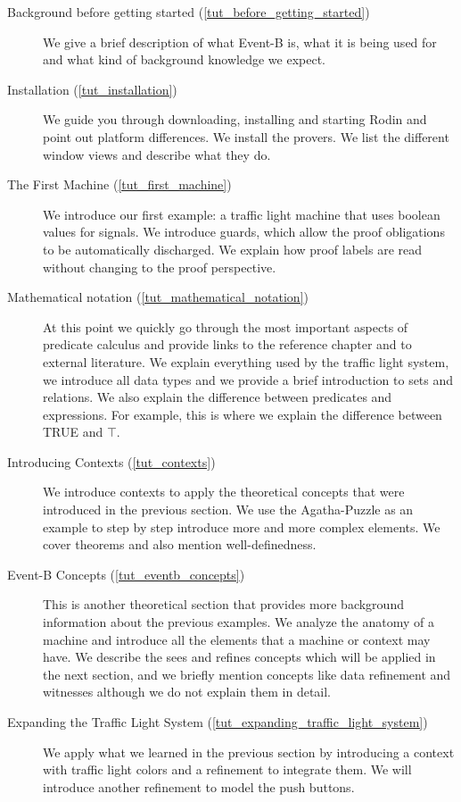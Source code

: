 \begin{description}
	\item[Background before getting started (\ref{tut_before_getting_started})] We give a brief description of what Event-B is, what it is being used for and what kind of background knowledge we expect.
	\item[Installation (\ref{tut_installation})] We guide you through downloading, installing and starting Rodin and point out platform differences.  We install the provers.  We list the different window views and describe what they do.
	\item[The First Machine (\ref{tut_first_machine})] We introduce our first example: a traffic light machine that uses boolean values for signals.  We introduce guards, which allow the proof obligations to be automatically discharged.  We explain how proof labels are read without changing to the proof perspective.
	\item[Mathematical notation (\ref{tut_mathematical_notation})] At this point we quickly go through the most important aspects of predicate calculus and provide links to the reference chapter and to external literature.  We explain everything used by the traffic light system, we introduce all data types and we provide a brief introduction to sets and relations.  We also explain the difference between predicates and expressions. For example, this is where we explain the difference between TRUE and $\top$.  
	\item[Introducing Contexts (\ref{tut_contexts})] We introduce contexts to apply the theoretical concepts that were introduced in the previous section.  We use the Agatha-Puzzle as an example to step by step introduce more and more complex elements.  We cover theorems and also mention well-definedness.
	\item[Event-B Concepts (\ref{tut_eventb_concepts})] This is another theoretical section that provides more background information about the previous examples.  We analyze the anatomy of a machine and introduce all the elements that a machine or context may have. We describe the sees and refines concepts which will be applied in the next section, and we briefly mention concepts like data refinement and witnesses although we do not explain them in detail.
	\item[Expanding the Traffic Light System (\ref{tut_expanding_traffic_light_system})]  We apply what we learn\-ed in the previous section by introducing a context with traffic light colors and a refinement to integrate them.  We will introduce another refinement to model the push buttons.

\end{description}
